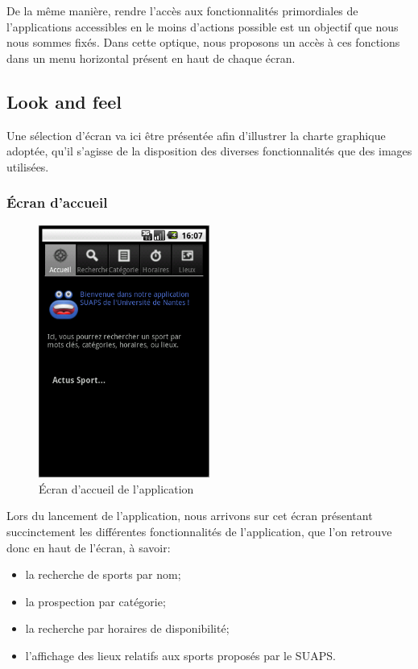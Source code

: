 \documentclass{article}
\begin{document}
	De la même manière, rendre l'accès aux fonctionnalités primordiales de
	l'applications accessibles en le moins d'actions possible est un objectif que
	nous nous sommes fixés.
	Dans cette optique, nous proposons un accès à ces fonctions dans un menu
	horizontal présent en haut de chaque écran.

	\subsection{Look and feel}

	Une sélection d'écran va ici être présentée afin d'illustrer la charte
	graphique adoptée, qu'il s'agisse de la disposition des diverses
	fonctionnalités que des images utilisées.

		\subsubsection{Écran d'accueil}

		\begin{figure}[ht]
			\centering
			\includegraphics[width=0.5\textwidth]{accueil.png}
			\caption{Écran d'accueil de l'application}
			\label{fig:accueil}
		\end{figure}

		Lors du lancement de l'application, nous arrivons sur cet écran présentant
		succinctement les différentes fonctionnalités de l'application, que l'on
		retrouve donc en haut de l'écran, à savoir:

		\begin{itemize}
			\item la recherche de sports par nom;
			\item la prospection par catégorie;
			\item la recherche par horaires de disponibilité;
			\item l'affichage des lieux relatifs aux sports proposés par le SUAPS.
		\end{itemize}
\end{document}
